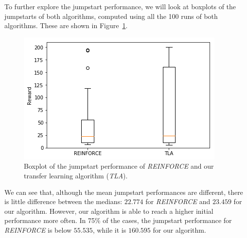 To further explore the jumpstart performance, we will look at boxplots of the jumpstarts of both algorithms, computed using all the 100 runs of both algorithms. These are shown in Figure~\ref{fig:boxplot_tla_re_5envs}.
\begin{figure}[H]
    \centering
    \includegraphics[width=.8\linewidth]{images/boxplot_tla_re_target_5envs.png}
    \caption{Boxplot of the jumpstart performance of \textit{REINFORCE} and our transfer learning algorithm (\textit{TLA}).}
    \label{fig:boxplot_tla_re_5envs}
\end{figure}
We can see that, although the mean jumpstart performances are different, there is little difference between the medians: $22.774$ for \textit{REINFORCE} and $23.459$ for our algorithm. However, our algorithm is able to reach a higher initial performance more often. In 75\% of the cases, the jumpstart performance for \textit{REINFORCE} is below $55.535$, while it is $160.595$ for our algorithm.

